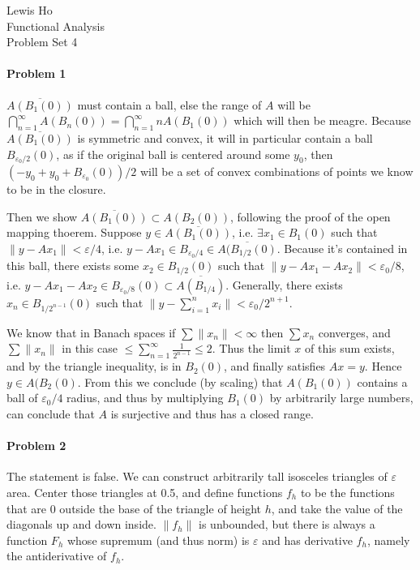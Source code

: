 \documentclass[12pt]{article}
\begin{document}
\begin{center}
  Lewis Ho\\
  Functional Analysis\\
  Problem Set 4
\end{center}

\paragraph{Problem 1}

$\overline{A(B_1(0))}$ must contain a ball, else the range of $A$ will be
$\bigcap_{n=1}^\infty A(B_n(0)) = \bigcap_{n=1}^\infty nA(B_1(0))$ which will
then be meagre. Because $\overline{A(B_1(0))}$ is symmetric and convex, it will
in particular contain a ball $B_{\varepsilon_0/2}(0)$, as if the original ball is
centered around some $y_0$, then $(-y_0 + y_0 + B_{\varepsilon_0}(0))/2$ will be
a set of convex combinations of points we know to be in the closure.

Then we show $\overline{A(B_1(0))}\subset A(B_2(0))$, following the proof of the
open mapping thoerem. Suppose $y \in \overline{A(B_1(0))}$, i.e. $\exists x_1\in
B_1(0)$ such that $\|y-Ax_1\| < \varepsilon/4$, i.e. $y-Ax_1 \in B_{\varepsilon_0
  /4}\in\overline{A(B_{1/2}(0)}$. Because it's contained in this ball, there exists
some $x_2 \in B_{1/2}(0)$ such that $\|y-Ax_1-Ax_2\|<\varepsilon_0/8$, i.e.
$y - Ax_1 - Ax_2 \in B_ {\varepsilon_0/8}(0) \subset \overline{A(B_{1/4})}$.
Generally, there exists $x_n \in B_{1/2^{n-1}}(0)$ such that $\|y-\sum_{i=1}^nx_i\|
< \varepsilon_0/2^{n+1}$.

We know that in Banach spaces if $\sum\|x_n\|<\infty$ then $\sum x_n$ converges,
and $\sum\|x_n\|$ in this case $ \leq \sum_{n=1}^\infty \frac{1}{2^{n-1}} \leq 2$.
Thus the limit $x$ of this sum exists, and by the triangle inequality, is in
$B_2(0)$, and finally satisfies $Ax = y$. Hence $y \in A(B_2(0)$. From this we
conclude (by scaling) that $A(B_1(0))$ contains a ball of $\varepsilon_0/4$ radius,
and thus by multiplying $B_1(0)$ by arbitrarily large numbers, can conclude that
$A$ is surjective and thus has a closed range.

\paragraph{Problem 2}

The statement is false. We can construct arbitrarily tall isosceles triangles of
$\varepsilon$ area. Center those triangles at 0.5, and define functions $f_
h$ to be the functions that are 0 outside the base of the triangle of height $h$,
and take the value of the diagonals up and down inside. $\|f_h\|$ is
unbounded, but there is always a function $F_h$ whose supremum (and thus norm) is
$\varepsilon$ and has derivative $f_h$, namely the antiderivative of $f_h$.
\end{document}
